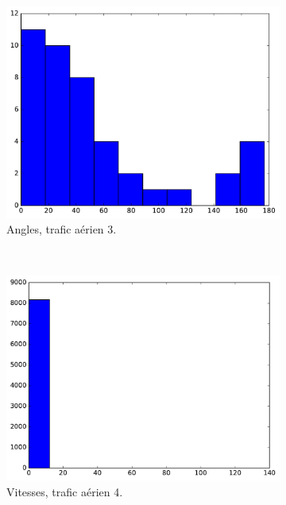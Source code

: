 \begin{figure}
\begin{subfigure}[t]{\subImgWclicks}
			\centering
			\includegraphics[width=\textwidth]{figures/ch3/hkg_angle}
			\caption{Angles, trafic aérien 3.}
			\label{fig:hkg_angle}
		\end{subfigure}
		~
		\begin{subfigure}[t]{\subImgWclicks}
			\centering
			\includegraphics[width=\textwidth]{figures/ch3/flightradar2a_speed}
			\caption{Vitesses, trafic aérien 4.}
			\label{fig:flightradar2a_speed}
		\end{subfigure}
		~
		\begin{subfigure}[t]{\subImgWclicks}
			\centering

\end{subfigure}
\end{figure}
